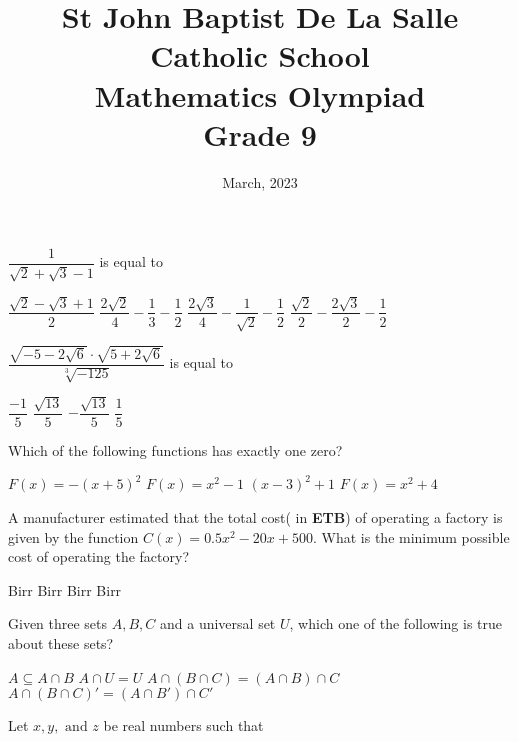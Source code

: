 \documentclass[12pt,addpoints]{exam}
\date{March, 2023}
\begin{document}
	\title{St John Baptist De La Salle Catholic School\\
		\large Mathematics Olympiad\\
		Grade 9}
	\maketitle
				\begin{questions}
					\question $\dfrac{1}{\sqrt{2}+\sqrt{3}-1}$ is equal to \\
					\begin{oneparchoices}
						\choice $\dfrac{\sqrt{2}-\sqrt{3}+1}{2}$
						\choice $\dfrac{2\sqrt{2}}{4}-\dfrac{1}{3}-\dfrac{1}{2}$
						\choice $\dfrac{2\sqrt{3}}{4}-\dfrac{1}{\sqrt{2}}-\dfrac{1}{2}$
						\choice $\dfrac{\sqrt{2}}{2}-\dfrac{2\sqrt{3}}{2}-\dfrac{1}{2}$
					\end{oneparchoices}
					\question $\dfrac{\sqrt{-5-2\sqrt{6}}\cdot\sqrt{5+2\sqrt{6}}}{\sqrt[3]{-125}}$ is equal to \\
					\begin{oneparchoices}
						\choice $\dfrac{-1}{5}$
						\choice $\dfrac{\sqrt{13}}{5}$
						\choice $-\dfrac{\sqrt{13}}{5}$
						\choice $\dfrac{1}{5}$
					\end{oneparchoices}
					\question Which of the following functions has exactly one zero? \\ \begin{oneparchoices}
						\choice $F(x)=-(x+5)^2$
						\choice $F(x)=x^2-1$
						\choice $(x-3)^2+1$
						\choice $F(x)=x^2+4$
					\end{oneparchoices}
					\question A manufacturer estimated that the total cost( in \textbf{ETB}) of operating a factory is given by the function $C(x)=0.5x^2-20x+500$. What is the minimum possible cost of operating the factory?\\ \begin{oneparchoices}
						\choice 4600 Birr
						\choice 4800 Birr
						\choice 5200 Birr
						\choice 5000 Birr
					\end{oneparchoices}
					\question Given three sets $A,B,C$ and a universal set $U$, which one of the following is true about these sets?\\ \begin{oneparchoices}
						\choice $A \subseteq A \cap B$
						\choice $A\cap U = U$
						\choice $A\cap(B\cap C)=(A\cap B)\cap C$
						\choice $A\cap(B\cap C)'=(A\cap B')\cap C'$
					\end{oneparchoices}
					\question Let $x,y, \text{ and }z$ be real numbers such that \begin{itemize}

\end{itemize}
\end{questions}
\end{document}
